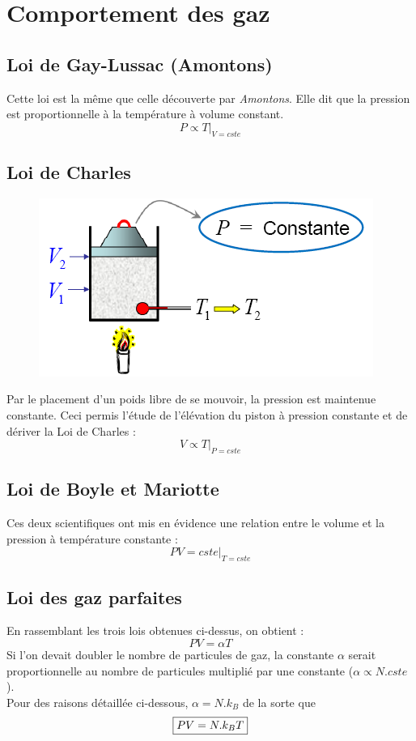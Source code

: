 \documentclass	[11pt, a4paper, openany]{book}
\begin{document}
\section{Comportement des gaz}
\subsection{Loi de Gay-Lussac (Amontons)}
Cette loi est la même que celle découverte par \textit{Amontons}. Elle dit que la pression est proportionnelle à la température à volume constant.
\begin{equation}
P \propto T|_{V = cste}
\end{equation}

\subsection{Loi de Charles}
\begin{figure}
\includegraphics[scale=0.23]{th/image5.png}
\end{figure}
Par le placement d'un poids libre de se mouvoir, la pression est maintenue constante. Ceci permis l'étude de l'élévation du piston à pression constante et de dériver la Loi de Charles :
\begin{equation}
V \propto T|_{P = cste}
\end{equation}

\subsection{Loi de Boyle et Mariotte}
Ces deux scientifiques ont mis en évidence une relation entre le volume et la pression à température constante :
\begin{equation}
PV = cste|_{T = cste}
\end{equation}

\subsection{Loi des gaz parfaites}
En rassemblant les trois lois obtenues ci-dessus, on obtient : 
\begin{equation}
PV = \alpha T
\end{equation}
Si l'on devait doubler le nombre de particules de gaz, la constante $\alpha$ serait proportionnelle au nombre de particules multiplié par une constante ($\alpha \propto N.cste$).\\
Pour des raisons détaillée ci-dessous, $\alpha = N.k_B$ de la sorte que
\begin{equation}
\fbox{$ PV = N.k_BT$}
\end{equation}
\end{document}
